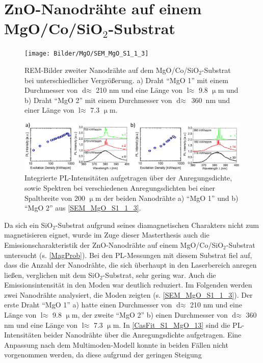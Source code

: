 \section{ZnO-Nanodrähte auf einem
MgO/Co/SiO$_\text{2}$-Substrat}\begin{figure}[t]
\texttt{[image: Bilder/MgO/SEM\_MgO\_S1\_1\_3]}
\caption{REM-Bilder zweiter Nanodrähte auf dem  MgO/Co/SiO$_\text{2}$-Substrat
bei unterschiedlicher Vergrößerung. a) Draht ``MgO 1'' mit einem Durchmesser von
$\text{d} \approx$ 210 nm und eine Länge von $\text{l} \approx$ 9.8 $\upmu$m und
b) Draht ``MgO 2'' mit einem Durchmesser von \mbox{$\text{d} \approx$ 360 nm}
und einer Länge von $\text{l} \approx$ 7.3 $\upmu$m.} \label{SEM_MgO_S1_1_3}
\centering \includegraphics[width=1\textwidth]{Bilder/MgO/CasFit_S1_MgO_1und3}
\caption{Integrierte PL-Intensitäten aufgetragen über der Anregungsdichte, sowie
Spektren bei verschiedenen Anregungsdichten bei einer Spaltbreite von 200
$\upmu$m der beiden Nanodrähte a) ``MgO 1'' und b) ``MgO 2'' aus
\autoref{SEM_MgO_S1_1_3}.} \label{CasFit_S1_MgO_13} \end{figure} Da sich ein
SiO$_\text{2}$-Substrat aufgrund seines diamagnetischen Charakters nicht zum
magnetisieren eignet, wurde im Zuge dieser Masterthesis auch die
Emissionscharakteristik der ZnO-Nanodrähte auf einem
MgO/Co/SiO$_\text{2}$-Substrat untersucht (s. \autoref{MagProb}). Bei den
PL-Messungen mit diesem Substrat fiel auf, dass die Anzahl der Nanodrähte, die
sich überhaupt in den Laserbereich anregen ließen, verglichen mit dem
SiO$_\text{2}$-Substrat, sehr gering war. Auch die Emissionsintensität in den
Moden war deutlich reduziert. Im Folgenden werden zwei Nanodrähte analysiert,
die Moden zeigten (s. \autoref{SEM_MgO_S1_1_3}). Der erste Draht ``MgO 1'' a)
hatte einen Durchmesser von $\text{d} \approx$ 210 nm und eine Länge von
$\text{l} \approx$ 9.8 $\upmu$m, der zweite ``MgO 2'' b) einen Durchmesser von
$\text{d} \approx$ 360 nm und eine Länge von $\text{l} \approx$ 7.3 $\upmu$m. In
\autoref{CasFit_S1_MgO_13} sind die PL-Intensitäten beider Nanodrähte über die
Anregungsdichte aufgetragen. Eine Anpassung nach dem Multimoden-Modell konnte in
beiden Fällen nicht vorgenommen werden, da diese aufgrund der geringen Steigung

